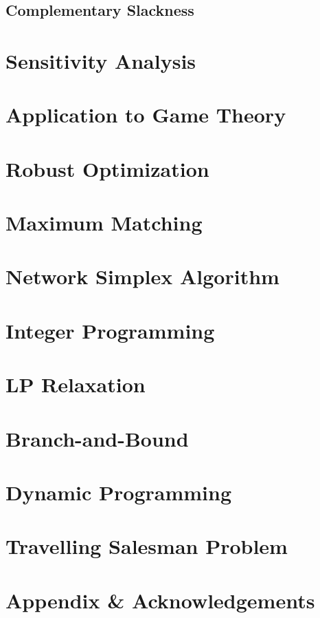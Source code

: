\documentclass{article}
\begin{document}
\subsection{Complementary Slackness}







\section{Sensitivity Analysis}

\section{Application to Game Theory}

\section{Robust Optimization}

\section{Maximum Matching}

\section{Network Simplex Algorithm}

\section{Integer Programming}

\section{LP Relaxation}

\section{Branch-and-Bound}


\section{Dynamic Programming}

\section{Travelling Salesman Problem}

\newpage 

\section*{Appendix \& Acknowledgements}
\end{document}
